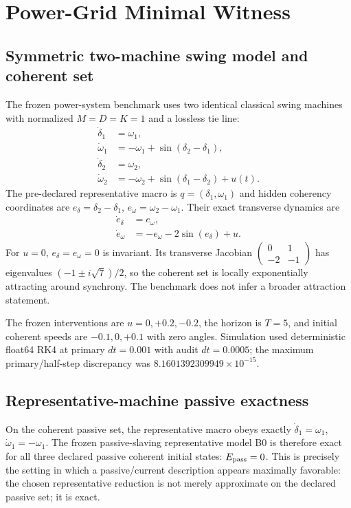 \section{Power-Grid Minimal Witness}

\subsection{Symmetric two-machine swing model and coherent set}

The frozen power-system benchmark uses two identical classical swing machines with normalized $M=D=K=1$ and a lossless tie line:
\begin{align}
\dot\delta_1&=\omega_1,\\
\dot\omega_1&=-\omega_1+\sin(\delta_2-\delta_1),\\
\dot\delta_2&=\omega_2,\\
\dot\omega_2&=-\omega_2+\sin(\delta_1-\delta_2)+u(t).
\end{align}
The pre-declared representative macro is $q=(\delta_1,\omega_1)$ and hidden coherency coordinates are $e_\delta=\delta_2-\delta_1$, $e_\omega=\omega_2-\omega_1$. Their exact transverse dynamics are
\begin{align}
\dot e_\delta&=e_\omega,\\
\dot e_\omega&=-e_\omega-2\sin(e_\delta)+u.
\end{align}
For $u=0$, $e_\delta=e_\omega=0$ is invariant. Its transverse Jacobian $\left(\begin{smallmatrix}0&1\\-2&-1\end{smallmatrix}\right)$ has eigenvalues $(-1\pm i\sqrt7)/2$, so the coherent set is locally exponentially attracting around synchrony. The benchmark does not infer a broader attraction statement.

The frozen interventions are $u=0,+0.2,-0.2$, the horizon is $T=5$, and initial coherent speeds are $-0.1,0,+0.1$ with zero angles. Simulation used deterministic float64 RK4 at primary $dt=0.001$ with audit $dt=0.0005$; the maximum primary/half-step discrepancy was $8.1601392309949\times10^{-15}$.

\subsection{Representative-machine passive exactness}

On the coherent passive set, the representative macro obeys exactly $\dot\delta_1=\omega_1$, $\dot\omega_1=-\omega_1$. The frozen passive-slaving representative model B0 is therefore exact for all three declared passive coherent initial states: $E_{\rm pass}=0$. This is precisely the setting in which a passive/current description appears maximally favorable: the chosen representative reduction is not merely approximate on the declared passive set; it is exact.

